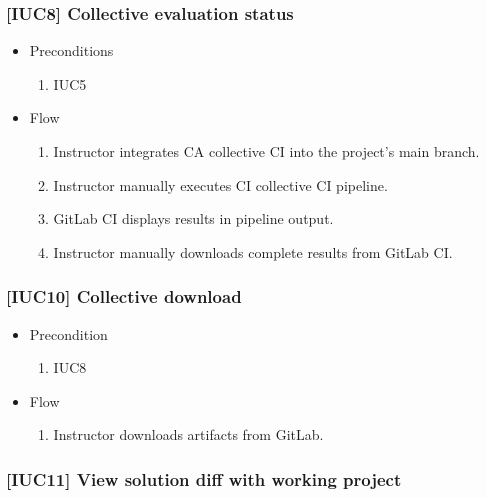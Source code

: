 \subsubsection{{[}IUC8{]} Collective evaluation status}

\begin{itemize}
\item
  {Preconditions}
    \begin{enumerate}
    \item
      {IUC5}
    \end{enumerate}
\end{itemize}

\begin{itemize}
\item
  {Flow}
    \begin{enumerate}
    \item
      {Instructor integrates CA collective CI into the project's main branch.}
    \item
      {Instructor manually executes CI collective CI pipeline.}
    \item
      {GitLab CI displays results in pipeline output.}
    \item
      {Instructor manually downloads complete results from GitLab CI.}
    \end{enumerate}
\end{itemize}

\subsubsection{{[}IUC10{]} Collective download}

\begin{itemize}
\item
  {Precondition}
    \begin{enumerate}
    \item
      {IUC8}
    \end{enumerate}
\end{itemize}

\begin{itemize}
\item
  {Flow}
    \begin{enumerate}
    \item
      {Instructor downloads artifacts from GitLab.}
    \end{enumerate}
\end{itemize}

\subsubsection{{[}IUC11{]} View solution diff with working project}


